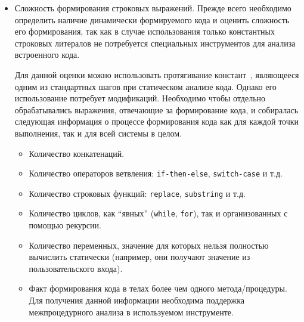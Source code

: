 \begin{enumerate}
\begin{itemize}
    \item Сложность формирования строковых выражений. Прежде всего необходимо определить наличие динамически формируемого кода и оценить сложность его формирования, так как в случае использования только константных строковых литералов не потребуется специальных инструментов для анализа встроенного кода.
    
    Для данной оценки можно использовать протягивание констант~\cite{Dragon}, являющееся одним из стандартных шагов при статическом анализе кода. Однако его использование потребует модификаций. Необходимо чтобы отдельно обрабатывались выражения, отвечающие за формирование кода, и собиралась следующая информация о процессе формирования кода как для каждой точки выполнения, так и для всей системы в целом.
    \begin{itemize}
      \item Количество конкатенаций.
      \item Количество операторов ветвления: \verb|if-then-else|, \verb|switсh-case| и т.д.
      \item Количество строковых функций: \verb|replace|, \verb|substring| и т.д.
      \item Количество циклов, как ``явных'' (\verb|while|, \verb|for|), так и организованных с помощью рекурсии.
      \item Количество переменных, значение для которых нельзя полностью вычислить статически (например, они получают значение из пользовательского входа).
      \item Факт формирования кода в телах более чем одного метода/процедуры. Для получения данной информации необходима поддержка межпроцедурного анализа в используемом инструменте.
    \end{itemize}
  \end{itemize}


\end{enumerate}
